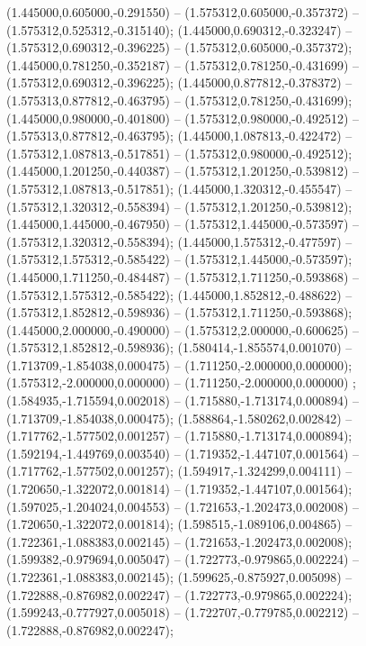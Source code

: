  (1.445000,0.605000,-0.291550) -- (1.575312,0.605000,-0.357372) -- (1.575312,0.525312,-0.315140);
 (1.445000,0.690312,-0.323247) -- (1.575312,0.690312,-0.396225) -- (1.575312,0.605000,-0.357372);
 (1.445000,0.781250,-0.352187) -- (1.575312,0.781250,-0.431699) -- (1.575312,0.690312,-0.396225);
 (1.445000,0.877812,-0.378372) -- (1.575313,0.877812,-0.463795) -- (1.575312,0.781250,-0.431699);
 (1.445000,0.980000,-0.401800) -- (1.575312,0.980000,-0.492512) -- (1.575313,0.877812,-0.463795);
 (1.445000,1.087813,-0.422472) -- (1.575312,1.087813,-0.517851) -- (1.575312,0.980000,-0.492512);
 (1.445000,1.201250,-0.440387) -- (1.575312,1.201250,-0.539812) -- (1.575312,1.087813,-0.517851);
 (1.445000,1.320312,-0.455547) -- (1.575312,1.320312,-0.558394) -- (1.575312,1.201250,-0.539812);
 (1.445000,1.445000,-0.467950) -- (1.575312,1.445000,-0.573597) -- (1.575312,1.320312,-0.558394);
 (1.445000,1.575312,-0.477597) -- (1.575312,1.575312,-0.585422) -- (1.575312,1.445000,-0.573597);
 (1.445000,1.711250,-0.484487) -- (1.575312,1.711250,-0.593868) -- (1.575312,1.575312,-0.585422);
 (1.445000,1.852812,-0.488622) -- (1.575312,1.852812,-0.598936) -- (1.575312,1.711250,-0.593868);
 (1.445000,2.000000,-0.490000) -- (1.575312,2.000000,-0.600625) -- (1.575312,1.852812,-0.598936);
 (1.580414,-1.855574,0.001070) -- (1.713709,-1.854038,0.000475) -- (1.711250,-2.000000,0.000000);
 (1.575312,-2.000000,0.000000) -- (1.711250,-2.000000,0.000000) ;
 (1.584935,-1.715594,0.002018) -- (1.715880,-1.713174,0.000894) -- (1.713709,-1.854038,0.000475);
 (1.588864,-1.580262,0.002842) -- (1.717762,-1.577502,0.001257) -- (1.715880,-1.713174,0.000894);
 (1.592194,-1.449769,0.003540) -- (1.719352,-1.447107,0.001564) -- (1.717762,-1.577502,0.001257);
 (1.594917,-1.324299,0.004111) -- (1.720650,-1.322072,0.001814) -- (1.719352,-1.447107,0.001564);
 (1.597025,-1.204024,0.004553) -- (1.721653,-1.202473,0.002008) -- (1.720650,-1.322072,0.001814);
 (1.598515,-1.089106,0.004865) -- (1.722361,-1.088383,0.002145) -- (1.721653,-1.202473,0.002008);
 (1.599382,-0.979694,0.005047) -- (1.722773,-0.979865,0.002224) -- (1.722361,-1.088383,0.002145);
 (1.599625,-0.875927,0.005098) -- (1.722888,-0.876982,0.002247) -- (1.722773,-0.979865,0.002224);
 (1.599243,-0.777927,0.005018) -- (1.722707,-0.779785,0.002212) -- (1.722888,-0.876982,0.002247);
